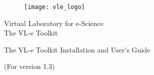 %
% 

\begin{center}
\begin{figure}[htbp]
\centerline{\texttt{[image: vle\_logo]}}
\end{figure}

\vspace{2cm} 

{\Large Virtual Laboratory for e-Science}\\
{\Large The VL-e Toolkit}\\ 

\vspace{1cm} 
 
{\Huge The VL-e Toolkit Installation and User\'{}s Guide}\\ 

\vspace{1cm} 

{(For version 1.3)}\\
\vspace{0.5cm} 
\vspace{0.5cm} 

\\
\\
\end{center}


